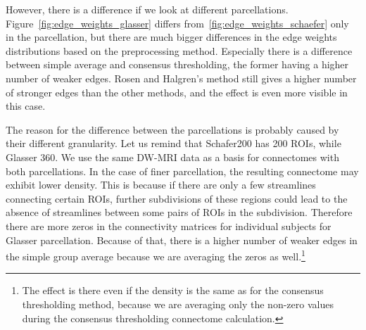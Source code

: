 However, there is a difference if we look at different parcellations. Figure~\ref{fig:edge_weights_glasser} differs from~\ref{fig:edge_weights_schaefer} only in the parcellation, but there are much bigger differences in the edge weights distributions based on the preprocessing method. Especially there is a difference between simple average and consensus thresholding, the former having a higher number of weaker edges. Rosen and Halgren's method still gives a higher number of stronger edges than the other methods, and the effect is even more visible in this case.

The reason for the difference between the parcellations is probably caused by their different granularity. Let us remind that Schafer200 has 200 ROIs, while Glasser 360. We use the same DW-MRI data as a basis for connectomes with both parcellations. In the case of finer parcellation, the resulting connectome may exhibit lower density. This is because if there are only a few streamlines connecting certain ROIs, further subdivisions of these regions could lead to the absence of streamlines between some pairs of ROIs in the subdivision. Therefore there are more zeros in the connectivity matrices for individual subjects for Glasser parcellation. Because of that, there is a higher number of weaker edges in the simple group average because we are averaging the zeros as well.\footnote{The effect is there even if the density is the same as for the consensus thresholding method, because we are averaging only the non-zero values during the consensus thresholding connectome calculation.}

